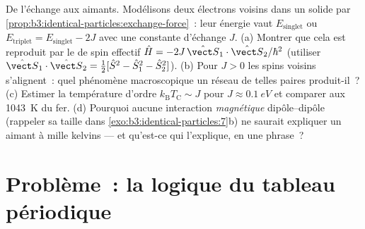 \begin{exercise}[$\star\star\star$]\label{exo:b3:identical-particles:12}
De l'échange aux aimants. Modélisons deux électrons voisins dans un
solide par \cref{prop:b3:identical-particles:exchange-force}~: leur
énergie vaut $E_{\text{singlet}}$ ou $E_{\text{triplet}} =
E_{\text{singlet}} - 2J$ avec une constante d'échange $J$. (a) Montrer
que cela est reproduit par le  de spin effectif $\hat H =
-2J\,\hat{\vect S}_1\cdot\hat{\vect S}_2/\hbar^2$ (utiliser
$\hat{\vect S}_1\cdot\hat{\vect S}_2 = \tfrac12[\hat S^2 - \hat
S_1^2 - \hat S_2^2]$). (b) Pour $J > 0$ les spins voisins s'alignent~:
quel phénomène macroscopique un réseau de telles paires produit-il~?
(c) Estimer la température d'ordre $k_{\text{B}}T_{\text{C}}
\sim J$ pour $J \approx \qty{0.1}{eV}$ et comparer aux
\qty{1043}{K} du fer. (d) Pourquoi aucune interaction \emph{magnétique}
dipôle--dipôle (rappeler sa taille dans
\cref{exo:b3:identical-particles:7}b) ne saurait expliquer un aimant
à mille kelvins --- et qu'est-ce qui l'explique, en une phrase~?
\end{exercise}

\section{Problème~: la logique du tableau périodique}

